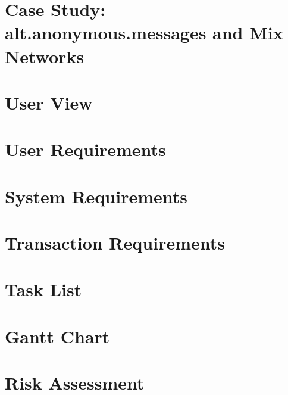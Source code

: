 \chapter{Case Study: alt.anonymous.messages and Mix Networks}


\chapter{User View}


\chapter{User Requirements}


\chapter{System Requirements}


\chapter{Transaction Requirements}


\chapter{Task List}


\chapter{Gantt Chart}


\chapter{Risk Assessment}


